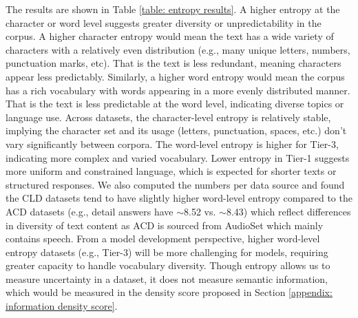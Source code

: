 The results are shown in Table \ref{table: entropy results}. A higher entropy at the character or word level suggests greater diversity or unpredictability in the corpus. A higher character entropy would mean the text has a wide variety of characters with a relatively even distribution (e.g., many unique letters, numbers, punctuation marks, etc). That is the text is less redundant, meaning characters appear less predictably. Similarly, a higher word entropy would mean the corpus has a rich vocabulary with words appearing in a more evenly distributed manner. That is the text is less predictable at the word level, indicating diverse topics or language use. Across datasets, the character-level entropy is relatively stable, implying the character set and its usage (letters, punctuation, spaces, etc.) don't vary significantly between corpora. The word-level entropy is higher for Tier-3, indicating more complex and varied vocabulary. Lower entropy in Tier-1 suggests more uniform and constrained language, which is expected for shorter texts or structured responses. We also computed the numbers per data source and found the CLD datasets tend to have slightly higher word-level entropy compared to the ACD datasets (e.g., detail answers have $\sim$8.52 vs. $\sim$8.43) which reflect differences in diversity of text content as ACD is sourced from AudioSet which mainly contains speech. From a model development perspective, higher word-level entropy datasets (e.g., Tier-3) will be more challenging for models, requiring greater capacity to handle vocabulary diversity. Though entropy allows us to measure uncertainty in a dataset, it does not measure semantic information, which would be measured in the density score proposed in Section \ref{appendix: information density score}. 

